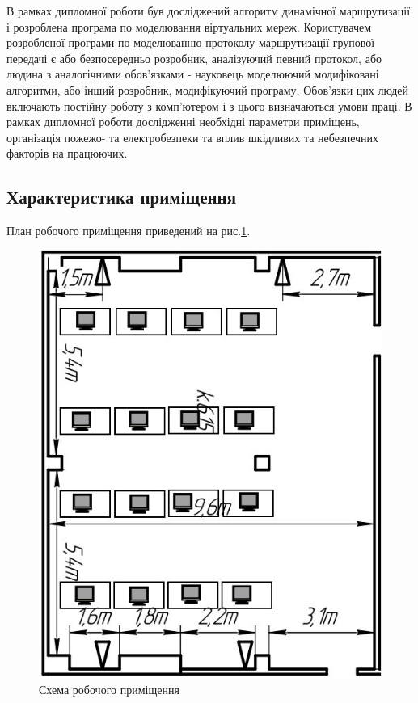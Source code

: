 \newpage
{}
    \TBD
    В рамках дипломної роботи був досліджений алгоритм динамічної маршрутизації і розроблена програма по 
    моделювання віртуальних мереж. Користувачем розробленої програми по моделюванню протоколу маршрутизації групової передачі є або
    безпосередньо розробник, аналізуючий певний протокол, або людина з аналогічними обов'язками - науковець
    моделюючий модифіковані алгоритми, або інший розробник, модифікуючий програму. Обов'язки цих людей
    включають постійну роботу з комп'ютером і з цього визначаються умови праці. В рамках дипломної роботи
    дослідженні необхідні параметри приміщень, організація пожежо- та електробезпеки та вплив шкідливих
    та небезпечних факторів на працюючих.
    
\subsection{Характеристика приміщення}
    План робочого приміщення приведений на рис.\ref{fig:lab-plan}.
    \begin{figure}[h!]
            \begin{center}
                \includegraphics[scale=0.7]{labour/lab-plan9a}
            \end{center}
            \caption{Схема робочого приміщення}
            \label{fig:lab-plan}
    \end{figure}

